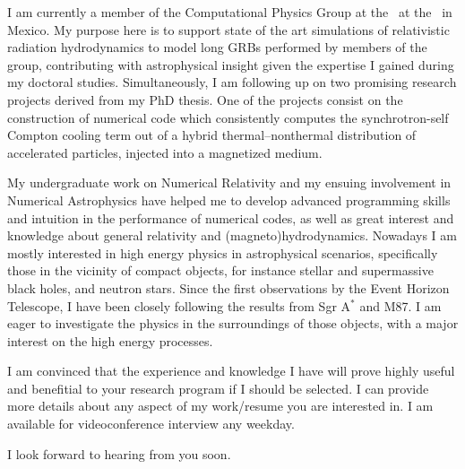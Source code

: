 I am currently a member of the Computational Physics Group at the \IFMen\ at the
\UMSNHes\ in Mexico. My purpose here is to support state of the art simulations
of relativistic radiation hydrodynamics to model long GRBs performed by members
of the group, contributing with astrophysical insight given the expertise I
gained during my doctoral studies. Simultaneously, I am following up on two
promising research projects derived from my PhD thesis. One of the projects
consist on the construction of numerical code which consistently computes the
synchrotron-self Compton cooling term out of a hybrid thermal--nonthermal
distribution  of accelerated particles, injected into a magnetized medium.

My undergraduate work on Numerical Relativity and my ensuing involvement in
Numerical Astrophysics have helped me to develop advanced programming skills and
intuition in the performance of numerical codes, as well as great interest and
knowledge about general relativity and (magneto)hydrodynamics. Nowadays I am
mostly interested in high energy physics in astrophysical scenarios,
specifically those in the vicinity of compact objects, for instance stellar and
supermassive black holes, and neutron stars. Since the first observations by the
Event Horizon Telescope, I have been closely following the results from Sgr
A$^{*}$ and M87. I am eager to investigate the physics in the surroundings of
those objects, with a major interest on the high energy processes.

I am convinced that the experience and knowledge I have will prove highly useful
and benefitial to your research program if I should be selected. I can provide
more details about any aspect of my work/resume you are interested in. I am
available for videoconference interview any weekday.

I look forward to hearing from you soon.

\makeletterclosing%

